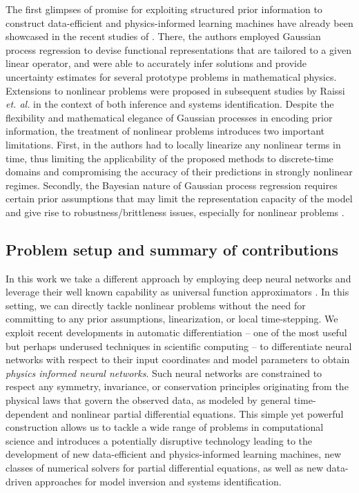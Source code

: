 \documentclass[preprint,12pt]{elsarticle}
\begin{document}
The first glimpses of promise for exploiting structured prior information to construct data-efficient and physics-informed learning machines have already been showcased in the recent studies of \cite{raissi2017inferring, raissi2017machine, owhadi2015bayesian}. There, the authors employed Gaussian process regression \cite{Rasmussen06gaussianprocesses} to devise functional representations that are tailored to a given linear operator, and were able to accurately infer solutions and provide uncertainty estimates for several prototype problems in mathematical physics. Extensions to nonlinear problems were proposed in subsequent studies by Raissi {\em et. al.} \cite{raissi2017numerical, raissi2017hidden} in the context of both inference and systems identification. Despite the flexibility and mathematical elegance of Gaussian processes in encoding prior information, the treatment of nonlinear problems introduces two important limitations. First, in \cite{raissi2017numerical,raissi2017hidden} the authors had to locally linearize any nonlinear terms in time, thus limiting the applicability of the proposed methods to discrete-time domains and compromising the accuracy of their predictions in strongly nonlinear regimes. Secondly, the Bayesian nature of Gaussian process regression requires certain prior assumptions that may limit the representation capacity of the model and give rise to robustness/brittleness issues, especially for nonlinear problems \cite{owhadi2015brittleness}.

\subsection{Problem setup and summary of contributions}
In this work we take a different approach by employing deep neural networks and leverage their well known capability as universal function approximators \cite{hornik1989multilayer}. In this setting, we can directly tackle nonlinear problems without the need for committing to any prior assumptions, linearization, or local time-stepping. We exploit recent developments in automatic differentiation \cite{baydin2015automatic} -- one of the most useful but perhaps underused techniques in scientific computing -- to differentiate neural networks with respect to their input coordinates and model parameters to obtain {\em physics informed neural networks}. Such neural networks are constrained to respect any symmetry, invariance, or conservation principles originating from the physical laws that govern the observed data, as modeled by general time-dependent and nonlinear partial differential equations. This simple yet powerful construction allows us to tackle a wide range of problems in computational science and introduces a potentially disruptive technology leading to the development of new data-efficient and physics-informed learning machines, new classes of numerical solvers for partial differential equations, as well as new data-driven approaches for model inversion and systems identification.\\
\end{document}
